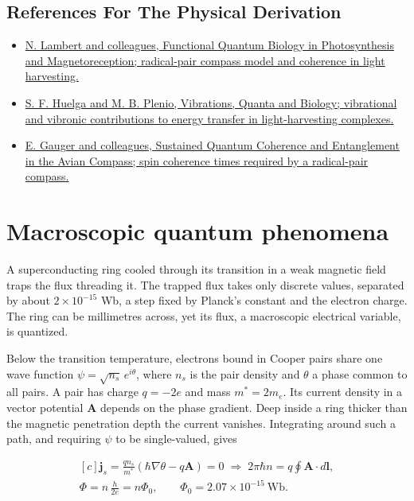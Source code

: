 \documentclass[11pt,oneside]{book}
\newenvironment{centeredalign}{\[\begin{gathered}[c]}{\end{gathered}\]}
\begin{document}
\subsection*{References For The Physical Derivation}
\begin{itemize}
\item \href{https://arxiv.org/abs/1205.0883}{N. Lambert and colleagues, Functional Quantum Biology in Photosynthesis and Magnetoreception; radical-pair compass model and coherence in light harvesting.}
\item \href{https://arxiv.org/abs/1307.3530}{S. F. Huelga and M. B. Plenio, Vibrations, Quanta and Biology; vibrational and vibronic contributions to energy transfer in light-harvesting complexes.}
\item \href{https://arxiv.org/abs/0906.3725}{E. Gauger and colleagues, Sustained Quantum Coherence and Entanglement in the Avian Compass; spin coherence times required by a radical-pair compass.}
\end{itemize}





\clearpage

\section{Macroscopic quantum phenomena}

\label{topic:macroscopic-quantum-phenomena}

A superconducting ring cooled through its transition in a weak magnetic field traps the flux threading it. The trapped flux takes only discrete values, separated by about \(2\times10^{-15}\) Wb, a step fixed by Planck's constant and the electron charge. The ring can be millimetres across, yet its flux, a macroscopic electrical variable, is quantized.

Below the transition temperature, electrons bound in Cooper pairs share one wave function \(\psi=\sqrt{n_s}\,e^{i\theta}\), where \(n_s\) is the pair density and \(\theta\) a phase common to all pairs. A pair has charge \(q=-2e\) and mass \(m^*=2m_e\). Its current density in a vector potential \(\mathbf A\) depends on the phase gradient. Deep inside a ring thicker than the magnetic penetration depth the current vanishes. Integrating around such a path, and requiring \(\psi\) to be single-valued, gives

\begin{centeredalign}
\mathbf j_s=\frac{qn_s}{m^*}\left(\hbar\nabla\theta-q\mathbf A\right)=0
\;\Rightarrow\;2\pi\hbar n=q\oint\mathbf A\cdot d\mathbf l,\\
\Phi=n\,\frac{h}{2e}=n\Phi_0,\qquad \Phi_0=2.07\times10^{-15}\ \mathrm{Wb}.
\end{centeredalign}
\end{document}
